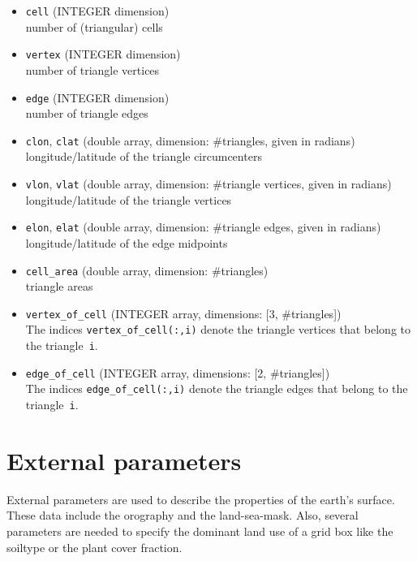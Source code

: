 \begin{itemize}
 \item \texttt{cell} (INTEGER dimension) \\
        number of (triangular) cells
 \item \texttt{vertex} (INTEGER dimension) \\
        number of triangle vertices
 \item \texttt{edge} (INTEGER dimension) \\
        number of triangle edges
 \item \texttt{clon}, \texttt{clat} (double array, dimension: \#triangles, given in radians) \\
        longitude/latitude of the triangle circumcenters
 \item \texttt{vlon}, \texttt{vlat} (double array, dimension: \#triangle vertices, given in radians) \\
        longitude/latitude of the triangle vertices
 \item \texttt{elon}, \texttt{elat} (double array, dimension: \#triangle edges, given in radians) \\
       longitude/latitude of the edge midpoints
 \item \texttt{cell\_area} (double array, dimension: \#triangles) \\
       triangle areas
 \item \texttt{vertex\_of\_cell} (INTEGER array, dimensions: [3, \#triangles]) \\
       The indices \texttt{vertex\_of\_cell(:,i)} denote the triangle vertices that belong 
       to the triangle~\texttt{i}.
 \item \texttt{edge\_of\_cell} (INTEGER array, dimensions: [2, \#triangles]) \\
       The indices \texttt{edge\_of\_cell(:,i)} denote the triangle edges that belong
       to the triangle~\texttt{i}.
\end{itemize}



\section{External parameters}
\label{section:extpar}
External parameters are used to describe the properties of the earth's surface. 
These data include the orography and the land-sea-mask. Also, several parameters
are needed to specify the dominant land use of a grid box like the soiltype
or the plant cover fraction.

